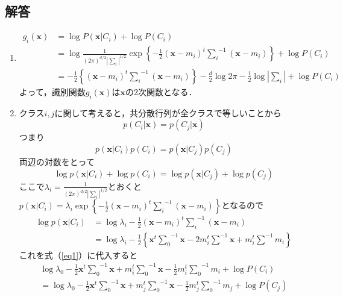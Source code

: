 \subsection*{解答}
\begin{enumerate}
    \renewcommand{\labelenumi}{(\alph{enumi})}
    \item
    \begin{align*}
        g_i(\bm{x})&=\log{P(\bm{x}|C_i)}+\log{P(C_i)}\\
        &=\log{\frac{1}{(2\pi)^{d/2}\left|\bm{\sum}_i\right|^{1/2}}\exp\left\{-\frac{1}{2}(\bm{x}-m_i)^t{{\bm{\sum}}_i}^{-1}(\bm{x}-m_i)\right\}+\log{P(C_i)}}\\
        &=-\frac{1}{2}\left\{(\bm{x}-m_i)^t{{\bm{\sum}}_i}^{-1}(\bm{x}-m_i)\right\}-\frac{d}{2}\log{2\pi}-\frac{1}{2}\log{\left|{\bm{\sum}}_i\right|}+\log{P(C_i)}
    \end{align*}
    よって，識別関数$g_i(\bm{x})$は$\bm{x}$の2次関数となる．
    \item
    クラス$i,j$に関して考えると，共分散行列が全クラスで等しいことから
    \begin{equation*}
        p(C_i|\bm{x})=p(C_j|\bm{x})
    \end{equation*}
    つまり
    \begin{equation*}
        p(\bm{x}|C_i)p(C_i)=p(\bm{x}|C_j)p(C_j)
    \end{equation*}
    両辺の対数をとって
    \begin{equation}
        \log{p(\bm{x}|C_i)}+\log{p(C_i)}=\log{p(\bm{x}|C_j)}+\log{p(C_j)}
        \label{eq1}
    \end{equation}
    ここで$\lambda_i=\frac{1}{(2\pi)^{d/2}\left|\bm{\sum}_i\right|^{1/2}}$とおくと$p(\bm{x}|C_i)=\lambda_i\exp\left\{-\frac{1}{2}(\bm{x}-m_i)^t{{\bm{\sum}}_i}^{-1}(\bm{x}-m_i)\right\}$となるので
    \begin{align*}
        \log{p(\bm{x}|C_i)}&=\log{\lambda_i}-\frac{1}{2}(\bm{x}-m_i)^t{{\bm{\sum}}_i}^{-1}(\bm{x}-m_i)\\
        &=\log{\lambda_i}-\frac{1}{2}\left\{\bm{x}^t{{\bm{\sum}}_0}^{-1}\bm{x}-2m_i^t{\bm{\sum}}^{-1}\bm{x}+m_i^t{\bm{\sum}}^{-1}m_i\right\}
    \end{align*}
    これを式（\ref{eq1}）に代入すると
    \begin{align*}
        \log\lambda_0-\frac{1}{2}\bm{x}^t{{\bm{\sum}}_0}^{-1}\bm{x}+m_i^t{{\bm{\sum}}_0}^{-1}\bm{x}-\frac{1}{2}m_i^t{{\bm{\sum}}_0}^{-1}m_i+\log{P(C_i)}\\
        =\log\lambda_0-\frac{1}{2}\bm{x}^t{{\bm{\sum}}_0}^{-1}\bm{x}+m_j^t{{\bm{\sum}}_0}^{-1}\bm{x}-\frac{1}{2}m_j^t{{\bm{\sum}}_0}^{-1}m_j+\log{P(C_j)}

\end{align*}
\end{enumerate}

